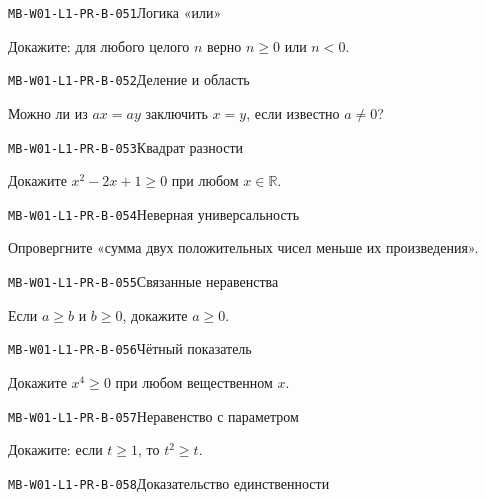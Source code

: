 \documentclass[11pt,a4paper,openany]{book}
\newcommand{\muid}[1]{\texttt{\footnotesize #1}}
\begin{document}
\noindent\hypertarget{MB-W01-L1-PR-B-051}{}\muid{MB-W01-L1-PR-B-051}\quad Логика «или»\par

Докажите: для любого целого $n$ верно $n\ge0$ или $n<0$.\par\medskip

\noindent\hypertarget{MB-W01-L1-PR-B-052}{}\muid{MB-W01-L1-PR-B-052}\quad Деление и область\par

Можно ли из $ax=ay$ заключить $x=y$, если известно $a\ne0$?\par\medskip

\noindent\hypertarget{MB-W01-L1-PR-B-053}{}\muid{MB-W01-L1-PR-B-053}\quad Квадрат разности\par

Докажите $x^2-2x+1\ge0$ при любом $x\in\mathbb R$.\par\medskip

\noindent\hypertarget{MB-W01-L1-PR-B-054}{}\muid{MB-W01-L1-PR-B-054}\quad Неверная универсальность\par

Опровергните «сумма двух положительных чисел меньше их произведения».\par\medskip

\noindent\hypertarget{MB-W01-L1-PR-B-055}{}\muid{MB-W01-L1-PR-B-055}\quad Связанные неравенства\par

Если $a\ge b$ и $b\ge0$, докажите $a\ge0$.\par\medskip

\noindent\hypertarget{MB-W01-L1-PR-B-056}{}\muid{MB-W01-L1-PR-B-056}\quad Чётный показатель\par

Докажите $x^4\ge0$ при любом вещественном $x$.\par\medskip

\noindent\hypertarget{MB-W01-L1-PR-B-057}{}\muid{MB-W01-L1-PR-B-057}\quad Неравенство с параметром\par

Докажите: если $t\ge1$, то $t^2\ge t$.\par\medskip

\noindent\hypertarget{MB-W01-L1-PR-B-058}{}\muid{MB-W01-L1-PR-B-058}\quad Доказательство единственности\par
\end{document}
